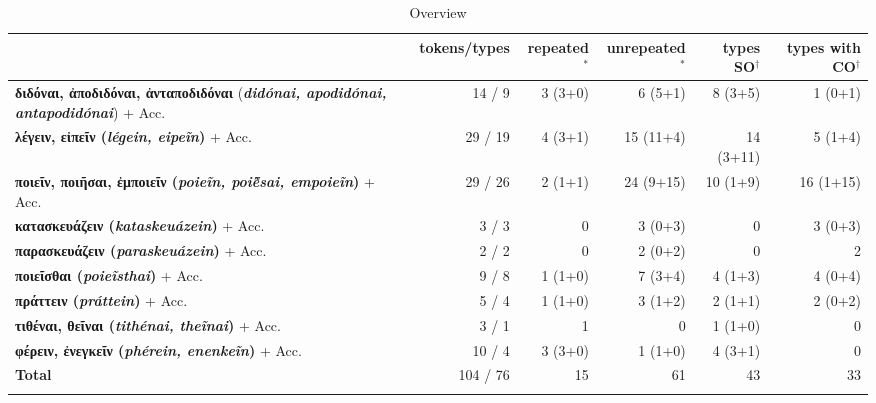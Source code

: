 \documentclass[output=paper,colorlinks,citecolor=brown]{langscibook}
\begin{document}
\begin{table}[b]
{\scriptsize
\begin{tabularx}{\linewidth}{Qrrrrr}
    \lsptoprule
& tokens/types
& repeated$^*$%
& unrepeated$^*$%
& types SO$^\dagger$%
& types with CO$^\dagger$%
\\
\midrule
\textbf{διδόναι, ἀποδιδόναι, ἀνταποδιδόναι} (\textbf{\textit{didónai, apodidónai, antapodidónai}}) + Acc.
& 14 / 9 &   3 (3+0) &  6 (5+1) & 8 (3+5) & 1 (0+1) \\
\tablevspace
\textbf{λέγειν, εἰπεῖν (\textit{légein, eipeĩn})} + Acc.
& 29 / 19 &  4 (3+1) &  {15 (11+4)} & 14 (3+11) & 5 (1+4) \\
\tablevspace
\textbf{ποιεῖν, ποιῆσαι, ἐμποιεῖν (\textit{poieĩn, poiē̃sai,  empoieĩn})} + Acc.
& 29 / 26 &  2 (1+1) &  {24 (9+15)} & 10 (1+9) & 16 (1+15) \\
\tablevspace
\textbf{κατασκευάζειν (\textit{kataskeuázein})} + Acc.
& 3 / 3 & 0 &  3 (0+3) & 0 & 3 (0+3) \\
\tablevspace
\textbf{παρασκευάζειν (\textit{paraskeuázein})} + Acc.
& 2 / 2 & 0 &  2 (0+2) & 0 & 2 \\
\tablevspace
\textbf{ποιεῖσθαι (\textit{poieĩsthai})} + Acc.
& 9 / 8 &  1 (1+0) &  7 (3+4) & 4 (1+3) & 4 (0+4)\\
\tablevspace
\textbf{πράττειν (\textit{práttein})} + Acc.
& 5 / 4 &  1 (1+0) &  3 (1+2) & 2 (1+1) & 2 (0+2) \\
\tablevspace
\textbf{τιθέναι, θεῖναι (\textit{tithénai, theĩnai})} + Acc.
& 3 / 1 &  1 & 0 & 1 (1+0) & 0 \\
\tablevspace
\textbf{φέρειν, ἐνεγκεῖν (\textit{phérein, enenkeĩn})} + Acc.
& 10 / 4 &  3 (3+0) &  1 (1+0) & 4 (3+1) & 0 \\
\midrule
\textbf{Total}
& 104 / 76 & 15 & 61 & 43 & 33\\
\lspbottomrule
\end{tabularx}
\caption{Overview}
\label{tab:overview1}
}
\end{table}
\end{document}
